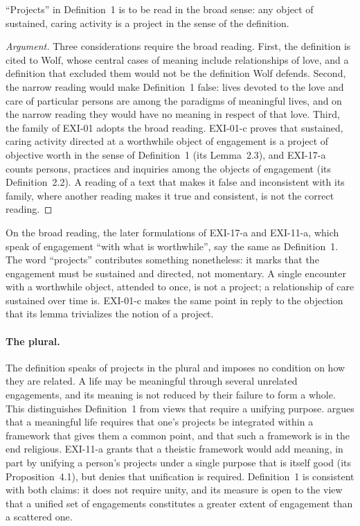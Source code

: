 \begin{proposition}\label{p:broad}
\enquote{Projects} in Definition~1 is to be read in the broad sense: any object of sustained, caring activity is a project in the sense of the definition.
\end{proposition}

\begin{proof}[Argument]
Three considerations require the broad reading. First, the definition is cited to Wolf, whose central cases of meaning include relationships of love, and a definition that excluded them would not be the definition Wolf defends. Second, the narrow reading would make Definition~1 false: lives devoted to the love and care of particular persons are among the paradigms of meaningful lives, and on the narrow reading they would have no meaning in respect of that love. Third, the family of EXI-01 adopts the broad reading. EXI-01-c proves that sustained, caring activity directed at a worthwhile object of engagement is a project of objective worth in the sense of Definition~1 (its Lemma~2.3), and EXI-17-a counts persons, practices and inquiries among the objects of engagement (its Definition~2.2). A reading of a text that makes it false and inconsistent with its family, where another reading makes it true and consistent, is not the correct reading.
\end{proof}

On the broad reading, the later formulations of EXI-17-a and EXI-11-a, which speak of engagement \enquote{with what is worthwhile}, say the same as Definition~1. The word \enquote{projects} contributes something nonetheless: it marks that the engagement must be sustained and directed, not momentary. A single encounter with a worthwhile object, attended to once, is not a project; a relationship of care sustained over time is. EXI-01-c makes the same point in reply to the objection that its lemma trivializes the notion of a project.

\paragraph{The plural.} The definition speaks of projects in the plural and imposes no condition on how they are related. A life may be meaningful through several unrelated engagements, and its meaning is not reduced by their failure to form a whole. This distinguishes Definition~1 from views that require a unifying purpose. \citet{Cottingham2003} argues that a meaningful life requires that one's projects be integrated within a framework that gives them a common point, and that such a framework is in the end religious. EXI-11-a grants that a theistic framework would add meaning, in part by unifying a person's projects under a single purpose that is itself good (its Proposition~4.1), but denies that unification is required. Definition~1 is consistent with both claims: it does not require unity, and its measure is open to the view that a unified set of engagements constitutes a greater extent of engagement than a scattered one.


